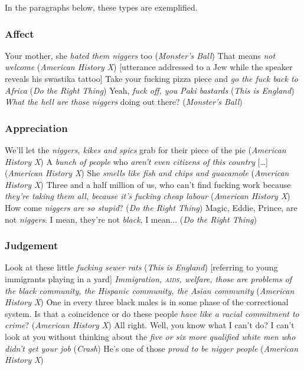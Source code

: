 \documentclass[output=paper]{LSP/langsci}
\begin{document}
In the paragraphs below, these types are exemplified.

\subsubsection{Affect}

\ea \label{ex:2:1} Your mother, she \emph{hated them niggers} too (\textit{Monster's Ball})
\z
\ea \label{ex:2:2} That means \emph{not welcome} (\textit{American History X}) [utterance addressed to a Jew while the speaker reveals his swastika tattoo]
\z
\ea \label{ex:2:3} Take your fucking pizza piece and \emph{go the fuck back to Africa} (\textit{Do the Right Thing})
\z
\ea \label{ex:2:4} Yeah, \emph{fuck off, you Paki bastards} (\textit{This is England})
\z
\ea \label{ex:2:5} \emph{What the hell are those niggers} doing out there? (\textit{Monster's Ball})
\z

\subsubsection{Appreciation}

\ea \label{ex:2:6} We'll let the \emph{niggers, kikes and spics} grab for their piece of the pie (\textit{American History X})
\z
\ea \label{ex:2:7} A \textit{bunch of people} who \emph{aren't even citizens of this country} [{\dots}] (\textit{American History X})
\z
\ea \label{ex:2:8} She \emph{smells like fish and chips and guacamole} (\textit{American History X})
\z
\ea \label{ex:2:9} Three and a half million of us, who can't find fucking work because \emph{they're taking them all, because it's fucking cheap labour} (\textit{American History X})
\z
\ea \label{ex:2:10} How come \emph{niggers are so stupid}? (\textit{Do the Right Thing})
\z
\ea \label{ex:2:11} Magic, Eddie, Prince, are not \emph{niggers}. I mean, they're not \emph{black}, I mean... (\textit{Do the Right Thing})
\z

\subsubsection{Judgement}


\ea \label{ex:2:12} Look at these little \emph{fucking sewer rats} (\textit{This is England}) [referring to young immigrants playing in a yard]
\z
\ea \label{ex:2:13} \emph{Immigration, \textsc{aids}, welfare, those are problems of the black community, the Hispanic community, the Asian community} (\textit{American History X})
\z
\ea \label{ex:2:14} One in every three black males is in some phase of the correctional system. Is that a coincidence or do these people \emph{have like a racial commitment to crime}? (\textit{American History X})
\z
\ea \label{ex:2:15} All right. Well, you know what I can't do? I can't look at you without thinking about the \emph{five or six more qualified white men who didn't get your job} (\textit{Crash})
\z
\ea \label{ex:2:16} He's one of those \emph{proud to be nigger people} (\textit{American History X})
\z
\end{document}

